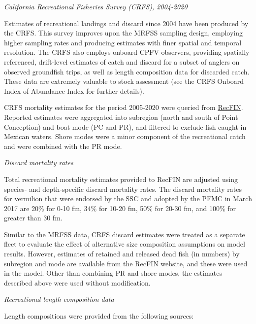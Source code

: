 \documentclass[
  english,
  a4paper,
]{article}
\begin{document}
\emph{California Recreational Fisheries Survey (CRFS), 2004-2020}

Estimates of recreational landings and discard since 2004 have been produced by
the CRFS. This survey improves upon the MRFSS sampling design, employing higher
sampling rates and producing estimates with finer spatial and temporal resolution. The CRFS also employs onboard CPFV observers, providing spatially referenced, drift-level estimates of catch and discard for a subset of anglers on observed groundfish trips, as well as length composition data for discarded catch. These data are extremely valuable to stock assessment (see the CRFS Onboard Index of Abundance Index for
further details).

CRFS mortality estimates for the period 2005-2020 were queried from \href{www.recfin.org}{RecFIN}.
Reported estimates were aggregated into subregion (north and south of Point Conception) and boat mode (PC and PR), and filtered to exclude fish
caught in Mexican waters. Shore modes were a minor component of the recreational catch and were combined with the PR mode.

\emph{Discard mortality rates}

Total recreational mortality estimates provided to RecFIN are
adjusted using species- and depth-specific discard mortality rates.
The discard mortality rates for vermilion that were endorsed by the
SSC and adopted by the
PFMC in March 2017 are 20\% for 0-10 fm, 34\% for 10-20 fm, 50\% for 20-30 fm, and
100\% for greater than 30 fm.

Similar to the MRFSS data, CRFS discard estimates were treated as a separate fleet to evaluate the effect of alternative size composition assumptions on model results. However, estimates of retained and released dead fish (in numbers) by subregion and mode are available from the RecFIN website, and these were used in the model. Other than combining PR and shore modes, the estimates described above were used without modification.

\emph{Recreational length composition data}

Length compositions were provided from the following sources:
\end{document}
